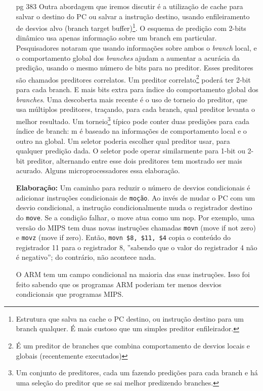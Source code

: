 \documentclass{article}
\begin{document}
\begin{enumerate}
\item[pg 383] Outra abordagem que iremos discutir é a utilização de cache para
salvar o destino do PC ou salvar a instrução destino, usando enfileiramento de
desvios alvo (branch target buffer)\footnote{Estrutura que salva na cache o PC
destino, ou instrução destino para um branch qualquer. É mais custoso que um
simples preditor enfileirador.}. O esquema de predição com 2-bits dinâmico usa
apenas informação sobre um branch em particular. Pesquisadores notaram que
usando informações sobre ambos o \textit{branch} local, e o comportamento global
dos \textit{branches} ajudam a aumentar a acurácia da predição, usando o mesmo
número de bits para no preditor. Esses preditores são chamados preditores
correlatos. Um preditor correlato\footnote{É um preditor de branches que combina
comportamento de desvios locais e globais (recentemente executados)} poderá ter
2-bit para cada branch. E mais bits extra para índice do comportamento global
dos \textit{branches}. Uma descoberta mais recente é o uso de torneio do
preditor, que usa múltiplos preditores, traçando, para cada branch, qual
preditor levanta o melhor resultado. Um torneio\footnote{Um conjunto de
preditores, cada um fazendo predições para cada branch e há uma seleção do
preditor que se sai melhor predizendo branches.} típico pode conter duas
predições para cada índice de branch: m é baseado na informações de
comportamento local e o outro na global. Um seletor poderia escolher qual
preditor usar, para qualquer predição dada. O seletor pode operar similarmente
para 1-bit ou 2-bit preditor, alternando entre esse dois preditores tem mostrado
ser mais acurado. Alguns microprocessadores essa elaboração.

\textbf{Elaboração:} Um caminho para reduzir o número de desvios condicionais é 
adicionar instruções condicionais de \verb|moção|. Ao invés de mudar o PC com 
um desvio condicional, a instrução condicionalmente muda o registrador destino 
do \verb|move|. Se a condição falhar, o move atua como um nop. Por exemplo, uma 
versão do MIPS tem duas novas instruções chamadas \verb|movn| (move if not 
zero) e \verb|movz| (move if zero). Então, \verb|movn $8, $11, $4| copia o 
conteúdo do registrador 11 para o registrador 8, ''sabendo que o valor do 
registrador 4 não é negativo''; do contrário, não acontece nada.

O ARM tem um campo condicional na maioria das suas instruções. Isso foi feito 
sabendo que os programas ARM poderiam ter menos desvios condicionais que 
programas MIPS.

\end{enumerate}
\end{document}
